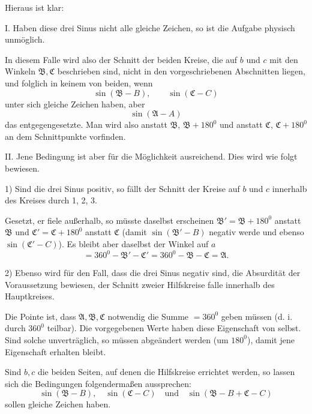 
Hieraus ist klar:

I. Haben diese drei Sinus nicht alle gleiche Zeichen, so ist die Aufgabe physisch unmöglich.

In diesem Falle wird also der Schnitt der beiden Kreise, die auf $b$ und $c$ mit den Winkeln $\mathfrak{B}, \mathfrak{C}$ beschrieben sind, nicht in den vorgeschriebenen Abschnitten liegen, und folglich in keinem von beiden, wenn
\[ \sin(\mathfrak{B}-B), \qquad \sin(\mathfrak{C}-C) \]
unter sich gleiche Zeichen haben, aber
\[ \sin(\mathfrak{A}-A) \]
das entgegengesetzte. Man wird also anstatt $\mathfrak{B}$, $\mathfrak{B}+180^0$ und anstatt $\mathfrak{C}$, $\mathfrak{C}+180^0$ an dem Schnittpunkte vorfinden.

II. Jene Bedingung ist aber für die Möglichkeit ausreichend. Dies wird wie folgt bewiesen.

1) Sind die drei Sinus positiv, so fällt der Schnitt der Kreise auf $b$ und $c$ innerhalb des Kreises durch 1, 2, 3.

 Gesetzt, er fiele außerhalb, so müsste daselbst erscheinen $\mathfrak{B}' = \mathfrak{B}+180^0$ anstatt $\mathfrak{B}$ und $\mathfrak{C}' = \mathfrak{C}+180^0$ anstatt $\mathfrak{C}$ (damit $\sin(\mathfrak{B}'-B)$ negativ werde und ebenso $\sin(\mathfrak{C}'-C)$). Es bleibt aber daselbst der Winkel auf $a$
\[ =360^0-\mathfrak{B}'-\mathfrak{C}'=360^0-\mathfrak{B}-\mathfrak{C}=\mathfrak{A}. \]

2) Ebenso wird für den Fall, dass die drei Sinus negativ sind, die Absurdität der Voraussetzung bewiesen, der Schnitt zweier Hilfskreise falle innerhalb des Hauptkreises.

Die Pointe ist, dass $\mathfrak{A}, \mathfrak{B}, \mathfrak{C}$ notwendig die Summe $=360^0$ geben müssen (d. i. durch $360^0$ teilbar). Die vorgegebenen Werte haben diese Eigenschaft von selbst. Sind solche unverträglich, so müssen  abgeändert werden (um $180^0$), damit jene Eigenschaft erhalten bleibt.

Sind $b, c$ die beiden Seiten, auf denen die Hilfskreise errichtet werden, so lassen sich die Bedingungen folgendermaßen aussprechen:
\[ \sin(\mathfrak{B}-B), \quad \sin(\mathfrak{C}-C) \quad \text{und} \quad \sin(\mathfrak{B}-B+\mathfrak{C}-C) \]
sollen gleiche Zeichen haben.
